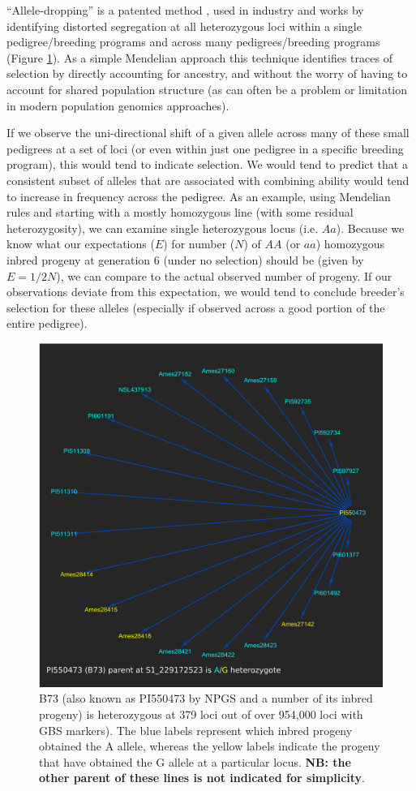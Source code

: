 \documentclass[12pt]{article}
\begin{document}
``Allele-dropping'' is a patented method \citep{sebastian1995method}, used in industry and works by identifying distorted segregation at all heterozygous loci within a single pedigree/breeding programs and across many pedigrees/breeding programs (Figure \ref{fig:alleledrop}). 
As a simple Mendelian approach this technique identifies traces of selection by directly accounting for ancestry, and without the worry of having to account for shared population structure \cite{sebastian1995method} (as can often be a problem or limitation in modern population genomics approaches). 

If we observe the uni-directional shift of a given allele across many of these small pedigrees at a set of loci (or even within just one pedigree in a specific breeding program), this would tend to indicate selection. 
We would tend to predict that a consistent subset of alleles that are associated with combining ability would tend to increase in frequency across the pedigree.
As an example, using Mendelian rules and starting with a mostly homozygous line (with some residual heterozygosity), we can examine single heterozygous locus (i.e. $Aa$). 
Because we know what our expectations ($E$) for number ($N$) of $AA$ (or $aa$) homozygous inbred progeny at generation 6 (under no selection) should be (given by $E = 1/2 N$), we can compare to the actual observed number of progeny. 
If our observations deviate from this expectation, we would tend to conclude breeder's selection for these alleles (especially if observed across a good portion of the entire pedigree). 

\begin{figure}
\includegraphics[width=0.5\linewidth]{Pruned.pdf}
\caption{B73 (also known as PI550473 by NPGS and a number of its inbred progeny) is heterozygous at 379 loci out of over 954,000 loci with GBS markers). The blue labels represent which inbred progeny obtained the A allele, whereas the yellow labels indicate the progeny that have obtained the G allele at a particular locus. \textbf{NB: the other parent of these lines is not indicated for simplicity}.}
\label{fig:alleledrop}
\end{figure}
\end{document}
